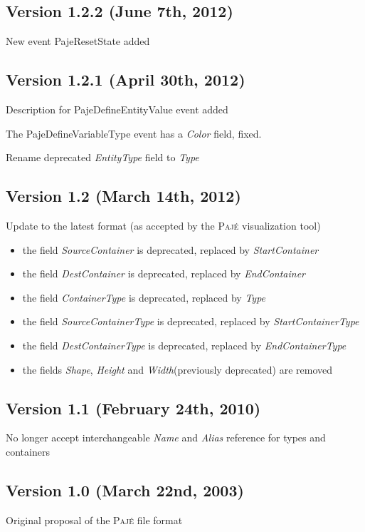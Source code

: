 \documentclass[12pt]{article}
\newcommand{\Paje}{\textsc{Paj\'e}\xspace}
\newcommand{\PajeField}[1]{\emph{#1}\xspace}
\newcommand{\Name}{\PajeField{Name}}
\newcommand{\Type}{\PajeField{Type}}
\newcommand{\StartContainerType}{\PajeField{StartContainerType}}
\newcommand{\EndContainerType}{\PajeField{EndContainerType}}
\newcommand{\Alias}{\PajeField{Alias}}
\newcommand{\EndContainer}{\PajeField{EndContainer}}
\newcommand{\StartContainer}{\PajeField{StartContainer}}
\newcommand{\Color}{\PajeField{Color}}
\newcommand{\Shape}{\PajeField{Shape}}
\newcommand{\Height}{\PajeField{Height}}
\newcommand{\Width}{\PajeField{Width}}
\newcommand{\SourceContainer}{\PajeField{SourceContainer}}
\newcommand{\DestContainer}{\PajeField{DestContainer}}
\newcommand{\ContainerType}{\PajeField{ContainerType}}
\newcommand{\SourceContainerType}{\PajeField{SourceContainerType}}
\newcommand{\DestContainerType}{\PajeField{DestContainerType}}
\newcommand{\PajeEvent}[1]{\textsf{#1}\xspace}
\newcommand{\PajeDefineVariableType}{\PajeEvent{PajeDefineVariableType}}
\newcommand{\PajeDefineEntityValue}{\PajeEvent{PajeDefineEntityValue}}
\newcommand{\PajeResetState}{\PajeEvent{PajeResetState}}
\newenvironment{itemize*}%
               {\vspace{-1em}
                 \begin{itemize}%
                   \setlength{\itemsep}{0pt}%
                   \setlength{\parskip}{0pt}}%
               {\end{itemize}}
\begin{document}
\subsection*{Version 1.2.2 (June 7th, 2012)}
\begin{itemize*}
\item New event \PajeResetState added
\end{itemize*}

\subsection*{Version 1.2.1 (April 30th, 2012)}
\begin{itemize*}
\item Description for \PajeDefineEntityValue event added
\item The \PajeDefineVariableType event has a \Color field, fixed.
\item Rename deprecated \PajeField{EntityType} field to \Type
\end{itemize*}

\subsection*{Version 1.2 (March 14th, 2012)}
\begin{itemize*}
\item Update to the latest format (as accepted by the \Paje
  visualization tool)
  \begin{itemize}
    \item the field \SourceContainer is deprecated, replaced by \StartContainer
    \item the field \DestContainer is deprecated, replaced by \EndContainer
    \item the field \ContainerType is deprecated, replaced by \Type
    \item the field \SourceContainerType is deprecated, replaced by \StartContainerType
    \item the field \DestContainerType is deprecated, replaced by \EndContainerType
    \item the fields \Shape, \Height and \Width (previously deprecated) are removed
  \end{itemize}
\end{itemize*}


\subsection*{Version 1.1 (February 24th, 2010)}
\begin{itemize*}
\item No longer accept interchangeable \Name and \Alias reference for types and containers
\end{itemize*}

\subsection*{Version 1.0 (March 22nd, 2003)}
\begin{itemize*}
\item Original proposal of the \Paje file format
\end{itemize*}
\end{document}
